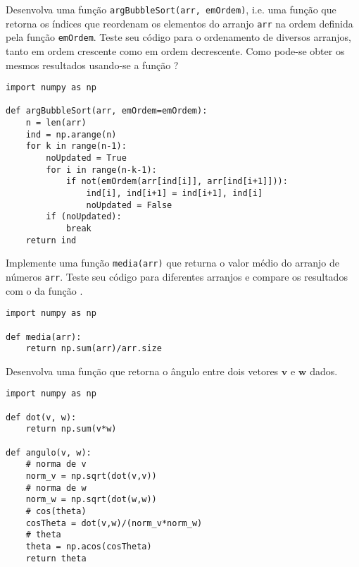 \begin{exer}
  Desenvolva uma função \lstinline+argBubbleSort(arr, emOrdem)+, i.e. uma função que retorna os índices que reordenam os elementos do arranjo \lstinline+arr+ na ordem definida pela função \lstinline+emOrdem+. Teste seu código para o ordenamento de diversos arranjos, tanto em ordem crescente como em ordem decrescente. Como pode-se obter os mesmos resultados usando-se a função {\PYTHONnumpyDOTargsort}?
\end{exer}
\begin{resp}

\begin{lstlisting}
import numpy as np

def argBubbleSort(arr, emOrdem=emOrdem):
    n = len(arr)
    ind = np.arange(n)
    for k in range(n-1):
        noUpdated = True
        for i in range(n-k-1):
            if not(emOrdem(arr[ind[i]], arr[ind[i+1]])):
                ind[i], ind[i+1] = ind[i+1], ind[i]
                noUpdated = False
        if (noUpdated):
            break
    return ind
\end{lstlisting}

\end{resp}

\begin{exer}
  Implemente uma função \lstinline+media(arr)+ que returna o valor médio do arranjo de números \lstinline+arr+. Teste seu código para diferentes arranjos e compare os resultados com o da função {\PYTHONnumpyDOTmean}.
\end{exer}
\begin{resp}

\begin{lstlisting}
import numpy as np

def media(arr):
    return np.sum(arr)/arr.size
\end{lstlisting}

\end{resp}

\begin{exer}
  Desenvolva uma função que retorna o ângulo entre dois vetores $\pmb{v}$ e $\pmb{w}$ dados.
\end{exer}
\begin{resp}

\begin{lstlisting}
import numpy as np

def dot(v, w):
    return np.sum(v*w)

def angulo(v, w):
    # norma de v
    norm_v = np.sqrt(dot(v,v))
    # norma de w
    norm_w = np.sqrt(dot(w,w))
    # cos(theta)
    cosTheta = dot(v,w)/(norm_v*norm_w)
    # theta
    theta = np.acos(cosTheta)
    return theta
\end{lstlisting}

\end{resp}

